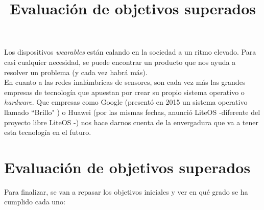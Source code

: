 Los dispositivos \textit{wearables} están calando en la sociedad a un ritmo elevado. Para casi
cualquier necesidad, se puede encontrar un producto que nos ayuda a resolver un problema (y cada vez habrá más).\\

En cuanto a las redes inalámbricas de sensores, son cada vez más las grandes empresas
de tecnología que apuestan por crear su propio sistema operativo o \textit{hardware}. Que empresas como Google (presentó
en 2015 un sistema operativo llamado ``Brillo" \cite{brillo}) o Huawei (por las mismas fechas, anunció LiteOS -diferente
del proyecto libre LiteOS \cite{liteos}-) nos hace darnos cuenta de la envergadura que
va a tener esta tecnología en el futuro.\\


\section{Evaluación de objetivos superados}
\title{Evaluación de objetivos superados}

Para finalizar, se van a repasar los objetivos iniciales y ver en qué grado se ha
cumplido cada uno:

